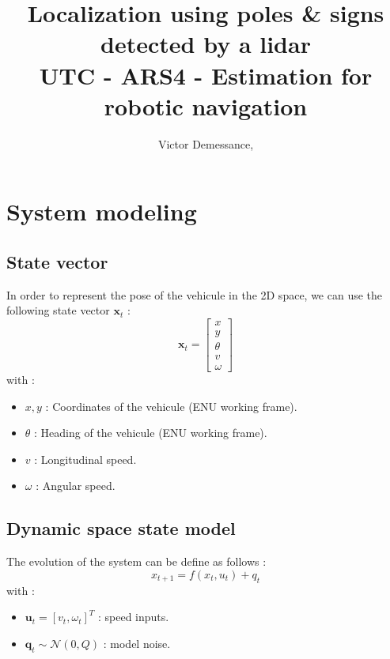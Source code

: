 \documentclass[conference]{IEEEtran}
\begin{document}
\title{
  Localization using poles \& signs detected by a lidar 
  \\
  \large UTC - ARS4 - Estimation for robotic navigation
}

\author{Victor Demessance, }

\maketitle

\section{System modeling}

\vspace{2mm}

\subsection{State vector}

\noindent In order to represent the pose of the vehicule in the 2D space, we can use the following state vector \( \mathbf{x}_t \) :
\[
\mathbf{x}_t = 
\begin{bmatrix}
x \\ 
y \\ 
\theta \\ 
v \\ 
\omega
\end{bmatrix}
\]
with :
\begin{itemize}
    \item \( x, y \) : Coordinates of the vehicule (ENU working frame).
    \item \( \theta \) : Heading of the vehicule (ENU working frame).
    \item \( v \) : Longitudinal speed.
    \item \( \omega \) : Angular speed.
\end{itemize}

\subsection{Dynamic space state model}

\noindent The evolution of the system can be define as follows :
\[
x_{t+1} = f(x_t, u_t) + q_t
\]
with :
\begin{itemize}
    \item $\mathbf{u}_t = [v_t, \omega_t]^T$ : speed inputs.
    \item $\mathbf{q}_t \sim \mathcal{N}(0, Q)$ : model noise.
\end{itemize}
\end{document}
